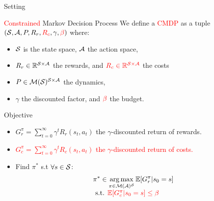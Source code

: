 \documentclass{beamer}
\begin{document}
    \begin{frame}{Setting}
        \begin{block}{\textcolor{red}{Constrained} Markov Decision Process}
            We define a \textcolor{red}{CMDP} as a tuple $(\mathcal{S}, \mathcal{A}, P, R_r,\textcolor{red}{R_c}, \gamma,\textcolor{red}{\beta})$ where:
            \begin{itemize}
                \item  $\mathcal{S}$ is the state space, $\mathcal{A}$ the action space,
                \item $R_r\in\mathbb{R}^{\mathcal{S} \times \mathcal{A}}$ the rewards, and $\textcolor{red}{R_c\in\mathbb{R}^{\mathcal{S} \times \mathcal{A}}}$ the costs
                \item $P\in \mathcal{M}(\mathcal{S})^{\mathcal{S} \times \mathcal{A}}$ the dynamics, %
                \item $\gamma$ the discounted factor, and $\textcolor{red}{\beta}$ the budget.
            \end{itemize}
        \end{block}

        \begin{block}{Objective}
            \begin{itemize}
                \item $G_r^\pi = \sum_{t=0}^\infty \gamma^t R_r(s_t, a_t)$ the $\gamma$-discounted return of rewards.
                \item \textcolor{red}{ $G_c^\pi = \sum_{t=0}^\infty \gamma^t R_c(s_t, a_t)$ the $\gamma$-discounted return of costs.}
                \item Find $\pi^*$ s.t $\forall s\in\mathcal{S}$:
                \begin{equation}
                    \label{eq:cmdp}
                    \begin{array}{lcr}
                        \displaystyle \pi^* \in \operatorname*{arg\,max}_{\pi\in\mathcal{M}(\mathcal{A})^{\mathcal{S}}} \operatorname*{\mathbb{E}}[G_r^\pi | s_0=s] \\
                        \text{ s.t. }  \textcolor{red}{\operatorname*{\mathbb{E}}[G_c^\pi | s_0=s] \leq \beta}
                    \end{array}
                \end{equation}
            \end{itemize}
        \end{block}
    \end{frame}
\end{document}

